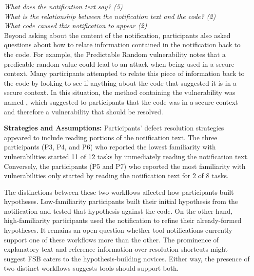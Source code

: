 \documentclass[10pt,journal,compsoc]{IEEEtran}
\begin{document}
\noindent\emph{What does the notification text say? (5)} \\
\emph{What is the relationship between the notification text and the code? (2)} \\
\emph{What code caused this notification to appear (2)} 
\\

Beyond asking about the content of the notification, participants also asked questions about how to relate information contained in the notification back to the code. 
For example, the Predictable Random vulnerability notes that a predicable random value could lead to an attack when being used in a secure context. 
Many participants attempted to relate this piece of information back to the code by looking to see if anything about the code that suggested it is in a secure context. 
In this situation, the method containing the vulnerability was named , which suggested to participants that the code was in a secure context and therefore a vulnerability that should be resolved.


\textbf{Strategies and Assumptions:}
Participants' defect resolution strategies appeared to include reading portions of the notification text. 
The three participants (P3, P4, and P6) who reported the lowest familiarity with vulnerabilities 
started 11 of 12 tasks by immediately reading the notification text. 
Conversely, the participants (P5 and P7) who reported the most familiarity with vulnerabilities only started by reading the notification text for 2 of 8 tasks.

The distinctions between these two workflows affected how participants built hypotheses.
Low-familiarity participants built their initial hypothesis from the notification and tested that hypothesis against the code. 
On the other hand, high-familiarity participants used the notification to refine their already-formed hypotheses. 
It remains an open question whether tool notifications currently support one of these workflows more than the other.
The prominence of explanatory text and reference information over resolution shortcuts might suggest FSB caters to the hypothesis-building novices.
Either way, the presence of two distinct workflows suggests tools should support both. 
\end{document}
